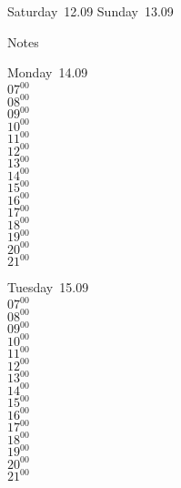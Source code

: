 \documentclass[11pt,a4paper]{book}\usepackage[]{graphicx}\usepackage[]{color}
\begin{document}
\begin{weekendbox}
  Saturday~12.09
  \tcblower
  Sunday~13.09
\end{weekendbox} %
\begin{notebox}
  Notes
\end{notebox}
\clearpage
\begin{headerbox}
\end{headerbox}
\begin{weekdaybox}
  Monday~14.09\\
  { 
  \vfill
  $07^{00}$\\
$08^{00}$\\
$09^{00}$\\
$10^{00}$\\
$11^{00}$\\
$12^{00}$\\
$13^{00}$\\
$14^{00}$\\
$15^{00}$\\
$16^{00}$\\
$17^{00}$\\
$18^{00}$\\
$19^{00}$\\
$20^{00}$\\
$21^{00}$\\
  }
\end{weekdaybox}
\begin{weekdaybox}
  Tuesday~15.09\\
  { 
  \vfill
  $07^{00}$\\
$08^{00}$\\
$09^{00}$\\
$10^{00}$\\
$11^{00}$\\
$12^{00}$\\
$13^{00}$\\
$14^{00}$\\
$15^{00}$\\
$16^{00}$\\
$17^{00}$\\
$18^{00}$\\
$19^{00}$\\
$20^{00}$\\
$21^{00}$\\
  }
\end{weekdaybox}
\end{document}
